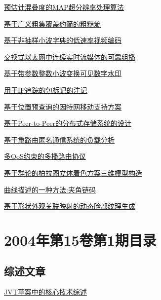 \documentclass[a4paper]{article}
\begin{document}
\href{http://www.jos.org.cn/ch/reader/download_pdf.aspx?file_no=20040207&year_id=2004&quarter_id=2&falg=1}{预估计混叠度的MAP超分辨率处理算法}

\href{http://www.jos.org.cn/ch/reader/download_pdf.aspx?file_no=20040208&year_id=2004&quarter_id=2&falg=1}{基于广义粗集覆盖约简的粗糙熵}

\href{http://www.jos.org.cn/ch/reader/download_pdf.aspx?file_no=20040209&year_id=2004&quarter_id=2&falg=1}{基于非抽样小波字典的低速率视频编码}

\href{http://www.jos.org.cn/ch/reader/download_pdf.aspx?file_no=20040210&year_id=2004&quarter_id=2&falg=1}{交换式以太网中连续实时流媒体的可靠组播}

\href{http://www.jos.org.cn/ch/reader/download_pdf.aspx?file_no=20040211&year_id=2004&quarter_id=2&falg=1}{基于带参数整数小波变换可见数字水印}

\href{http://www.jos.org.cn/ch/reader/download_pdf.aspx?file_no=20040212&year_id=2004&quarter_id=2&falg=1}{用于IP追踪的包标记的注记}

\href{http://www.jos.org.cn/ch/reader/download_pdf.aspx?file_no=20040213&year_id=2004&quarter_id=2&falg=1}{基于位置预查询的因特网移动支持方案}

\href{http://www.jos.org.cn/ch/reader/download_pdf.aspx?file_no=20040214&year_id=2004&quarter_id=2&falg=1}{基于Peer-to-Peer的分布式存储系统的设计}

\href{http://www.jos.org.cn/ch/reader/download_pdf.aspx?file_no=20040215&year_id=2004&quarter_id=2&falg=1}{基于重路由匿名通信系统的负载分析}

\href{http://www.jos.org.cn/ch/reader/download_pdf.aspx?file_no=20040216&year_id=2004&quarter_id=2&falg=1}{多QoS约束的多播路由协议}

\href{http://www.jos.org.cn/ch/reader/download_pdf.aspx?file_no=20040217&year_id=2004&quarter_id=2&falg=1}{基于群论的柏拉图立体着色方案三维模型构造}

\href{http://www.jos.org.cn/ch/reader/download_pdf.aspx?file_no=20040218&year_id=2004&quarter_id=2&falg=1}{曲线描述的一种方法:夹角链码}

\href{http://www.jos.org.cn/ch/reader/download_pdf.aspx?file_no=20040219&year_id=2004&quarter_id=2&falg=1}{基于形状外观关联映射的动态脸部纹理生成}


\section{\textbf{2004年第15卷第1期目录}}
\subsection{综述文章}
\href{http://www.jos.org.cn/ch/reader/download_pdf.aspx?file_no=20040108&year_id=2004&quarter_id=1&falg=1}{JVT草案中的核心技术综述}
\end{document}
